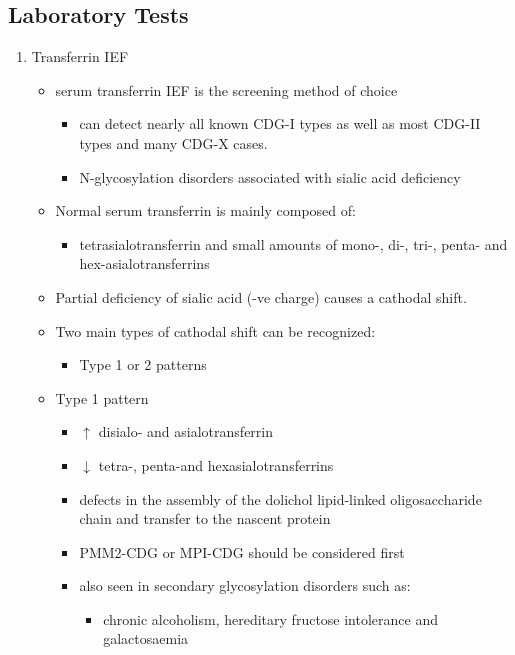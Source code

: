 \documentclass{scrartcl}
\begin{document}
\subsection{Laboratory Tests}
\label{sec:org323fb02}
\begin{enumerate}
\item Transferrin IEF
\label{sec:org61bd29a}
\begin{itemize}
\item serum transferrin IEF is the screening method of choice

\begin{itemize}
\item can detect nearly all known CDG-I types as well as most CDG-II types and many CDG-X cases.
\item N-glycosylation disorders associated with sialic acid deficiency
\end{itemize}

\item Normal serum transferrin is mainly composed of:
\begin{itemize}
\item tetrasialotransferrin and small amounts of mono-, di-, tri-,
penta- and hex-asialotransferrins
\end{itemize}

\item Partial deficiency of sialic acid (-ve charge) causes a
cathodal shift.

\item Two main types of cathodal shift can be recognized:
\begin{itemize}
\item Type 1 or 2 patterns
\end{itemize}

\item Type 1 pattern

\begin{itemize}
\item \(\uparrow\) disialo- and asialotransferrin

\item \(\downarrow\)  tetra-, penta-and hexasialotransferrins

\item defects in the assembly of the dolichol lipid-linked
oligosaccharide chain and transfer to the nascent protein
\item PMM2-CDG or MPI-CDG should be considered first

\item also seen in secondary glycosylation disorders such as:
\begin{itemize}
\item chronic alcoholism, hereditary fructose intolerance and galactosaemia
\end{itemize}
\end{itemize}


\end{itemize}
\end{enumerate}
\end{document}
